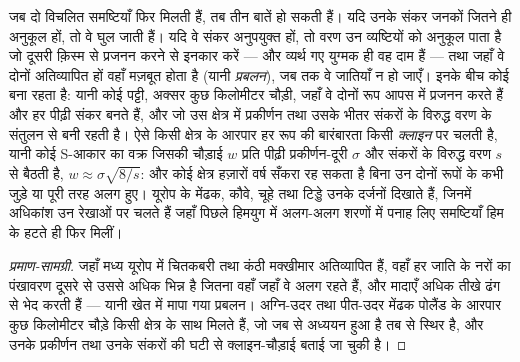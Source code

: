 \begin{proposition}[प्रबलन और संकर-क्षेत्र]\label{prop:b2:speciation:reinforcement}
जब दो विचलित समष्टियाँ फिर मिलती हैं, तब तीन बातें हो सकती हैं।
यदि उनके संकर जनकों जितने ही अनुकूल हों, तो वे घुल जाती हैं। यदि वे
संकर अनुपयुक्त हों, तो वरण उन व्यष्टियों को अनुकूल पाता है जो दूसरी क़िस्म से
प्रजनन करने से इनकार करें --- और व्यर्थ गए युग्मक ही वह दाम हैं --- तथा
जहाँ वे दोनों अतिव्यापित हों वहाँ  मज़बूत होता है
(यानी \emph{प्रबलन}), जब तक वे जातियाँ न हो जाएँ। इनके बीच कोई
\emph{} बना रहता है: यानी कोई पट्टी, अक्सर कुछ किलोमीटर चौड़ी,
जहाँ वे दोनों रूप आपस में प्रजनन करते हैं और हर पीढ़ी संकर बनते हैं,
और जो उस क्षेत्र में प्रकीर्णन तथा उसके भीतर संकरों के विरुद्ध वरण के
संतुलन से बनी रहती है। ऐसे किसी क्षेत्र के आरपार
हर रूप की बारंबारता किसी \emph{क्लाइन} पर चलती है, यानी कोई S-आकार का
वक्र जिसकी चौड़ाई $w$ प्रति पीढ़ी प्रकीर्णन-दूरी $\sigma$
और संकरों के विरुद्ध वरण $s$ से बैठती है, $w \approx
\sigma\sqrt{8/s}$: और कोई क्षेत्र हज़ारों वर्ष सँकरा रह सकता है
बिना उन दोनों रूपों के कभी जुड़े या पूरी तरह अलग हुए। यूरोप के मेंढक,
कौवे, चूहे तथा टिड्डे उनके दर्जनों दिखाते हैं, जिनमें अधिकांश उन रेखाओं पर
चलते हैं जहाँ पिछले हिमयुग में अलग-अलग शरणों में पनाह लिए समष्टियाँ
हिम के हटते ही फिर मिलीं।
\end{proposition}
\begin{proof}[प्रमाण-सामग्री]
जहाँ मध्य यूरोप में चितकबरी तथा कंठी मक्खीमार अतिव्यापित हैं,
वहाँ हर जाति के नरों का पंखावरण दूसरे से उससे अधिक भिन्न है
जितना वहाँ जहाँ वे अलग रहते हैं, और मादाएँ अधिक तीखे ढंग से
भेद करती हैं --- यानी खेत में मापा गया प्रबलन। अग्नि-उदर तथा
पीत-उदर मेंढक पोलैंड के आरपार कुछ किलोमीटर चौड़े किसी क्षेत्र के साथ
मिलते हैं, जो जब से अध्ययन हुआ है तब से स्थिर है, और
उनके प्रकीर्णन तथा उनके संकरों की घटी  से
क्लाइन-चौड़ाई बताई जा चुकी है।
\end{proof}

